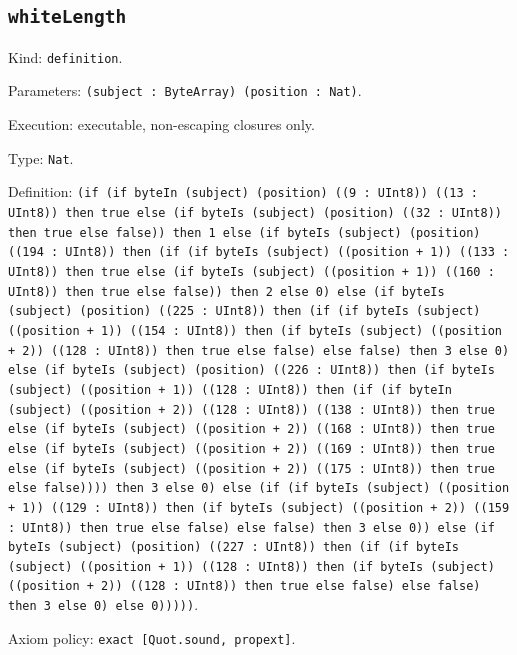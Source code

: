 \documentclass[11pt]{article}
\begin{document}
\subsection*{\texttt{whiteLength}}
\noindent Kind: \texttt{definition}.\par
\noindent Parameters: \texttt{(subject : ByteArray) (position : Nat)}.\par
\noindent Execution: executable, non-escaping closures only.\par
\noindent Type: \texttt{Nat}.\par
\noindent Definition: \texttt{(if (if byteIn (subject) (position) ((9 : UInt8)) ((13 : UInt8)) then true else (if byteIs (subject) (position) ((32 : UInt8)) then true else false)) then 1 else (if byteIs (subject) (position) ((194 : UInt8)) then (if (if byteIs (subject) ((position + 1)) ((133 : UInt8)) then true else (if byteIs (subject) ((position + 1)) ((160 : UInt8)) then true else false)) then 2 else 0) else (if byteIs (subject) (position) ((225 : UInt8)) then (if (if byteIs (subject) ((position + 1)) ((154 : UInt8)) then (if byteIs (subject) ((position + 2)) ((128 : UInt8)) then true else false) else false) then 3 else 0) else (if byteIs (subject) (position) ((226 : UInt8)) then (if byteIs (subject) ((position + 1)) ((128 : UInt8)) then (if (if byteIn (subject) ((position + 2)) ((128 : UInt8)) ((138 : UInt8)) then true else (if byteIs (subject) ((position + 2)) ((168 : UInt8)) then true else (if byteIs (subject) ((position + 2)) ((169 : UInt8)) then true else (if byteIs (subject) ((position + 2)) ((175 : UInt8)) then true else false)))) then 3 else 0) else (if (if byteIs (subject) ((position + 1)) ((129 : UInt8)) then (if byteIs (subject) ((position + 2)) ((159 : UInt8)) then true else false) else false) then 3 else 0)) else (if byteIs (subject) (position) ((227 : UInt8)) then (if (if byteIs (subject) ((position + 1)) ((128 : UInt8)) then (if byteIs (subject) ((position + 2)) ((128 : UInt8)) then true else false) else false) then 3 else 0) else 0)))))}.\par
\noindent Axiom policy: \texttt{exact [Quot.sound, propext]}.\par
\end{document}
